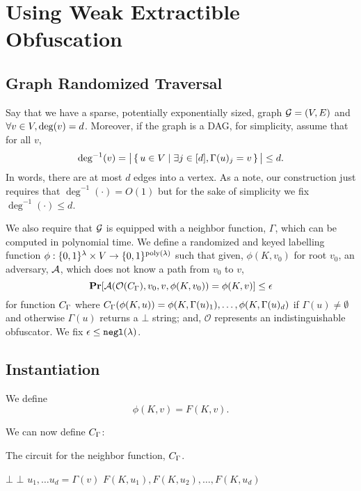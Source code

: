 \newcommand{\labelFunc}{\phi}
\newcommand{\imageFn}{\text{Image}}
\newcommand{\pathSuffix}{\text{Suff}}
\newcommand{\pathSet}{\mathcal{P}}
\newcommand{\obfFN}{\mathcal{O}}
\newcommand{\circMid}{C^{\text{Mid}}}

\section{Using Weak Extractible Obfuscation}

\subsection{Graph Randomized Traversal}
Say that we have a sparse, potentially exponentially sized, graph $\mathcal{G} = (V, E)$
and $\forall v \in V, \deg(v) = d$. Moreover, if the graph is a DAG, for simplicity,
assume that for all $v$, 
$$
\deg^{-1}(v) = \big|\set{u \in V \mid \exists j \in [d], \Gamma(u)_j = v}\big| \leq d.
$$
In words, there are at most $d$ edges into a vertex. As a note, our construction just requires
that $\deg^{-1}(\cdot) = O(1)$ but for the sake of simplicity we fix $\deg^{-1}(\cdot) \leq d$.

We also require that $\mathcal{G}$ is equipped with a neighbor function, $\Gamma$, which can be computed in polynomial time.
We define a randomized and keyed labelling function $\phi: \{0,1\}^\lambda \times V \rightarrow \{0,1\}^{\operatorname{poly}(\lambda)}$ 
such that given, $\phi(K, v_0)$ for root $v_0$, an adversary, $\mathcal{A}$, which does not know a path from $v_0$ to $v$,
\begin{equation}
	\label{eq:guessPhi}
	\Pr[\advers(\mathcal{O}(\circNeigb), v_0, v, \labelFunc(K, v_0)) = \labelFunc(K, v)] \leq \epsilon
\end{equation}
for function $C_\Gamma$ where $\circNeigb(\labelFunc(K, u)) = \labelFunc(K, \Gamma(u)_1), \dots, \labelFunc(K, \Gamma(u)_d)$
if $\Gamma(u) \neq \emptyset$ and otherwise $\Gamma(u)$ returns a $\bot$ string;
and, $\mathcal{O}$ represents an indistinguishable obfuscator.
We fix $\epsilon \leq \texttt{negl}(\lambda)$.

\subsection{Instantiation}
We define 
\begin{equation*}
	\labelFunc(K, v) = F(K, v).
\end{equation*}

We can now define $C_\Gamma$:
\begin{algorithm}[H]
	\caption{
		The circuit for the neighbor function, $C_\Gamma$.
	}
	\begin{algorithmic}[1]
				\State \Return $\bot$
			\EndIf
				\State \Return $\bot$
			\EndIf
			\State $u_1, \dots u_d = \Gamma(v)$
			\State \Return $F(K, u_1), F(K, u_2), \dots, F(K, u_d)$
		\EndFunction
	\end{algorithmic}
	\label{alg:neighb}
\end{algorithm}

